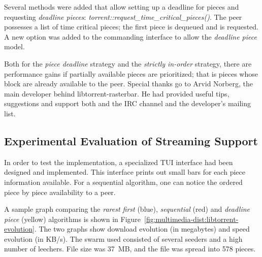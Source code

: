 Several methods were added that allow setting up a deadline for pieces and
requesting \textit{deadline pieces}:
\textit{torrent::request\_time\_critical\_pieces()}. The peer possesses a list
of time critical pieces; the first piece is dequeued and is requested. A new
option was added to the commanding interface to allow the \textit{deadline
piece} model.

Both for the \textit{piece deadline} strategy and the \textit{strictly
in-order} strategy, there are performance gains if partially available pieces
are prioritized; that is pieces whose block are already available to the peer.
Special thanks go to Arvid Norberg, the main developer behind
libtorrent-rasterbar. He had provided useful tips, suggestions and support
both and the IRC channel and the developer's mailing list.

\subsection{Experimental Evaluation of Streaming Support}
\label{subsec:multimedia-dist:libtorrent-results}

In order to test the implementation, a specialized TUI interface had been
designed and implemented. This interface prints out small bars for each piece
information available. For a sequential algorithm, one can notice the ordered
piece by piece availability to a peer.

A sample graph comparing the \textit{rarest first} (blue), \textit{sequential}
(red) and \textit{deadline piece} (yellow) algorithms is shown in
Figure~\ref{fig:multimedia-dist:libtorrent-evolution}. The two
graphs show download evolution (in megabytes) and speed evolution (in KB/s).
The swarm used consisted of several seeders and a high number of leechers.
File size was 37~MB, and the file was spread into 578 pieces.


